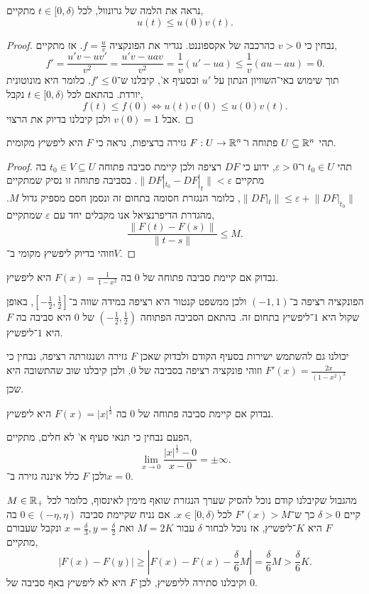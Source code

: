 \subquestion{}
נראה את הלמה של גרונוול, לכל $t \in [0, \delta)$ מתקיים,
\[
	u(t) \le u(0) v(t)
.\]
\begin{proof}
	נבחין כי $v > 0$ כהרכבה של אקספוננט.
	נגדיר את הפונקציה $f = \frac{u}{v}$.
	אז מתקיים,
	\[
		f'
		= \frac{u' v - u v'}{v^2}
		= \frac{u' v - u a v}{v^2}
		= \frac{1}{v} (u' - u a)
		\le \frac{1}{v} (a u - a u)
		= 0
	.\]
	תוך שימוש באי־השוויון הנתון על $u'$ ובסעיף א', קיבלנו ש־$f' \le 0$, כלומר היא מונוטונית יורדת.
	בהתאם לכל $t \in [0, \delta)$ נקבל,
	\[
		f(t) \le f(0)
		\iff u(t) v(0) \le u(0) v(t)
	.\]
	אבל $v(0) = 1$ ולכן קיבלנו בדיוק את הרצוי.
\end{proof}

\question{}
\subquestion{}
תהי $U \subseteq \mathbb{R}^n$ פתוחה ו־$F : U \to \mathbb{R}^n$ גזירה ברציפות,
נראה כי $F$ היא ליפשיץ מקומית.
\begin{proof}
	תהי $t_0 \in U$ ו־$\varepsilon > 0$, ידוע כי $D F$ רציפה ולכן קיימת סביבה פתוחה $t_0 \in V \subseteq U$ בה מתקיים $\lVert D F |_{t_0} - D F |_t \rVert < \varepsilon$.
	בסביבה פתוחה זו נסיק שמתקיים $\lVert D F |_t \rVert \le \varepsilon + \lVert DF |_{t_0} \rVert$, כלומר הנגזרת חסומה בתחום זה ונסמן חסם מספיק גדול $M$.
	מהגדרת הדיפרנציאל אנו מקבלים יחד עם $\varepsilon$ שמתקיים,
	\[
		\frac{\lVert F(t) - F(s) \rVert}{\lVert t - s \rVert}
		\le M
	.\]
	וזוהי בדיוק ליפשיץ מקומי ב־$V$.
\end{proof}

\subquestion{}
נבדוק אם קיימת סביבה פתוחה של $0$ בה $F(x) = \frac{1}{1 - x^2}$ היא ליפשיץ.
\begin{solution}
	הפונקציה רציפה ב־$(-1, 1)$ ולכן ממשפט קנטור היא רציפה במידה שווה ב־$[-\frac{1}{2}, \frac{1}{2}]$, באופן שקול היא $1$־ליפשיץ בתחום זה.
	בהתאם הסביבה הפתוחה $(-\frac{1}{2}, \frac{1}{2})$ של $0$ היא סביבה בה $F$ היא $1$־ליפשיץ.

	יכולנו גם להשתמש ישירות בסעיף הקודם ולבדוק שאכן $F$ גזירה ושנגזרתה רציפה, נבחין כי $F'(x) = \frac{2x}{{(1 - x^2)}^2}$ וזוהי פונקציה רציפה בסביבה של $0$, ולכן קיבלנו שוב שהתשובה היא שכן.
\end{solution}

\subquestion{}
נבדוק אם קיימת סביבה פתוחה של $0$ בה $F(x) = {|x|}^{\frac{1}{3}}$ היא ליפשיץ.
\begin{solution}
	הפעם נבחין כי תנאי סעיף א' לא חלים, מתקיים,
	\[
		\lim_{x \to 0} \frac{{|x|}^{\frac{1}{3}} - 0}{x - 0}
		= \pm \infty
	.\]
	ולכן $F$ כלל איננה גזירה ב־$x = 0$.

	מהגבול שקיבלנו קודם נוכל להסיק שערך הנגזרת שואף מימין לאינסוף, כלומר לכל $M \in \mathbb{R}_+$ קיים $\delta > 0$ כך ש־$F'(x) > M$ לכל $x \in [0, \delta)$.
	אם נניח שקיימת סביבה $0 \in (-\eta, \eta)$ בה $F$ היא $K$־ליפשיץ, אז נוכל לבחור $\delta$ עבור $M = 2 K$ ואת $x = \frac{\delta}{3}, y = \frac{\delta}{2}$ ונקבל שעבורם מתקיים,
	\[
		|F(x) - F(y)|
		\ge |F(x) - F(x) - \frac{\delta}{6} M|
		= \frac{\delta}{6} M
		> \frac{\delta}{6} K
	.\]
	וקיבלנו סתירה לליפשיץ, לכן $F$ היא לא ליפשיץ באף סביבה של $0$.
\end{solution}

